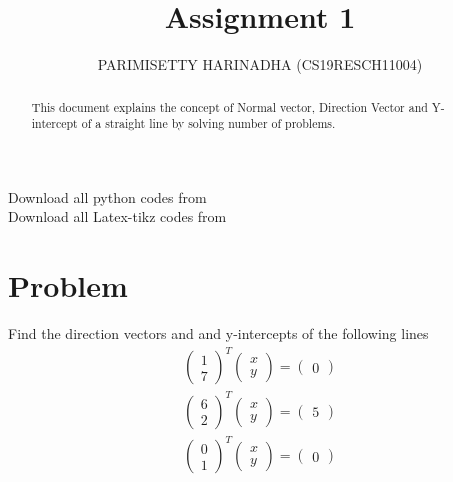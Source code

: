 \documentclass[journal,12pt,twocolumn]{IEEEtran}
\title{Assignment 1}
\author{PARIMISETTY HARINADHA (CS19RESCH11004)}
\newcommand{\myvec}[1]{\ensuremath{\begin{pmatrix}#1\end{pmatrix}}}
\begin{document}
\maketitle
\newpage
\begin{abstract}
This document explains the concept of Normal vector, Direction Vector and Y-intercept of a straight line by solving number of problems.
\end{abstract}
Download all python codes from 
 \\
\newline
Download all Latex-tikz codes from 

\section{Problem}
Find the direction vectors and and y-intercepts of the following lines \\
\begin{align} 
    		\myvec{ 1 \\ 7 }^{T} \myvec{ x \\ y } = \myvec{ 0 }
\end{align}
\begin{align} 
    		\myvec{ 6 \\ 2 }^{T} \myvec{ x \\ y } = \myvec{ 5 }
\end{align}
\begin{align} 
    		\myvec{ 0 \\ 1 }^{T} \myvec{ x \\ y } = \myvec{ 0 }
\end{align}
\end{document}
